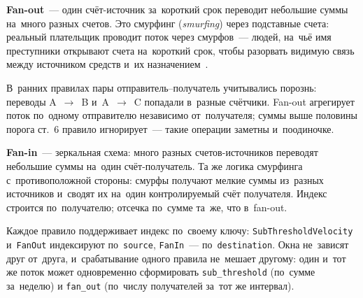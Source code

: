 
\textbf{Fan-out}~--- один счёт-источник за~короткий срок переводит
небольшие суммы на~много разных счетов. Это смурфинг (\textit{smurfing}) через
подставные счета: реальный плательщик проводит поток через смурфов~--- людей,
на~чьё имя преступники открывают счета на~короткий срок, чтобы
разорвать видимую связь между источником средств и~их
назначением~\cite{garg-aml-2025}.

В~ранних правилах пары отправитель--получатель учитывались порознь: переводы
A~$\to$~B и~A~$\to$~C попадали в~разные счётчики. Fan-out агрегирует поток
по~одному отправителю независимо от~получателя; суммы выше половины порога
ст.~6 правило игнорирует~--- такие операции заметны и~поодиночке.


\textbf{Fan-in}~--- зеркальная схема: много разных счетов-источников
переводят небольшие суммы на~один счёт-получатель. Та же логика смурфинга
с~противоположной стороны: смурфы получают мелкие суммы из~разных источников
и~сводят их на~один контролируемый счёт получателя. Индекс строится
по~получателю; отсечка по~сумме та~же, что в~fan-out.


Каждое правило поддерживает индекс по~своему ключу: \texttt{SubThresholdVelocity}
и~\texttt{FanOut} индексируют по~\texttt{source}, \texttt{FanIn}~---
по~\texttt{destination}. Окна не~зависят друг от~друга, и~срабатывание одного
правила не~мешает другому: один и~тот же поток может одновременно сформировать
\texttt{sub\_threshold} (по~сумме за~неделю) и \texttt{fan\_out} (по~числу
получателей за~тот же интервал).


